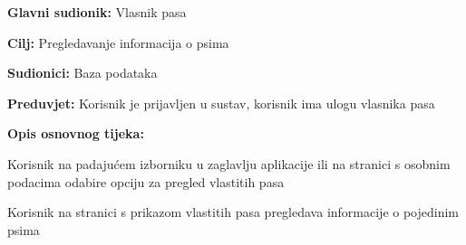 					\noindent {}
					\begin{packed_item}
						
						\item \textbf{Glavni sudionik: } Vlasnik pasa
						\item  \textbf{Cilj:} Pregledavanje informacija o psima
						\item  \textbf{Sudionici:} Baza podataka 
						\item  \textbf{Preduvjet:} Korisnik je prijavljen u sustav, korisnik ima ulogu vlasnika pasa
						\item  \textbf{Opis osnovnog tijeka:}
						
						\item[] \begin{packed_enum}
							\item Korisnik na padajućem izborniku u zaglavlju aplikacije ili na stranici s osobnim podacima odabire opciju za pregled vlastitih pasa 
							\item Korisnik na stranici s prikazom vlastitih pasa pregledava informacije o pojedinim psima
							
						\end{packed_enum}
					\end{packed_item}
				
